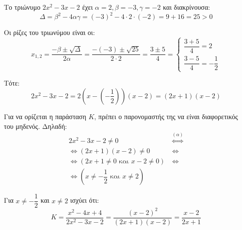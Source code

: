 
\begin{alist}
\item Το τριώνυμο $2x^2 - 3x - 2$ έχει $\alpha = 2, \beta = -3, \gamma = -2$ και διακρίνουσα:
\[\Delta = \beta^2 - 4\alpha\gamma = (-3)^2 - 4 \cdot 2 \cdot (-2) = 9 + 16 = 25 > 0\]

Οι ρίζες του τριωνύμου είναι οι:
\[x_{1,2} = \dfrac{-\beta \pm \sqrt{\Delta}}{2\alpha} = \dfrac{-(-3) \pm \sqrt{25}}{2 \cdot 2} = \dfrac{3 \pm 5}{4} = \begin{cases} \dfrac{3 + 5}{4} = 2 \\ \dfrac{3 - 5}{4} = -\dfrac{1}{2} \end{cases}\]

Τότε:
\[2x^2 - 3x - 2 = 2\left(x - \left(-\dfrac{1}{2}\right)\right)(x - 2) = (2x + 1)(x - 2)\]

\item Για να ορίζεται η παράσταση $K$, πρέπει ο παρονομαστής της να είναι διαφορετικός του μηδενός. Δηλαδή:
\begin{align*}
2x^2 - 3x - 2 \ne 0 &\stackrel{(\alpha)}{\Leftrightarrow} \\
\Leftrightarrow (2x + 1)(x - 2) \ne 0 \ &\Leftrightarrow \\
\Leftrightarrow (2x + 1 \ne 0 \text{ και } x - 2 \ne 0) \ &\Leftrightarrow \\
\Leftrightarrow \left(x \ne -\dfrac{1}{2} \text{ και } x \ne 2\right)&
\end{align*}

\item Για $x \ne -\dfrac{1}{2}$ και $x \ne 2$ ισχύει ότι:
\[K = \dfrac{x^2 - 4x + 4}{2x^2 - 3x - 2} = \dfrac{(x - 2)^2}{(2x + 1)(x - 2)} = \dfrac{x - 2}{2x + 1}\]
\end{alist}

